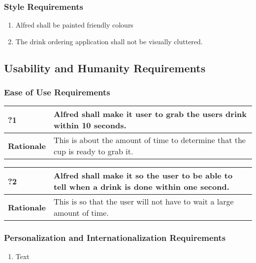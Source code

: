 \documentclass [11pt]{article}
\begin{document}
\subsubsection{Style Requirements}
	\begin{enumerate}[label=\textbf{(\roman*)}]
		\item  Alfred shall be painted friendly colours
		\item The drink ordering application shall not be visually cluttered.
	\end{enumerate}

\subsection{Usability and Humanity Requirements} 

\subsubsection{Ease of Use Requirements}
\begin{longtable}{| p{ } | p{ } | }\hline 
	\rowcolor{tableCell}\textbf{?1} & Alfred shall make it user to grab the users drink within 10 seconds. \\ \hline
	\textbf{Rationale} &  This is about the amount of time to determine that the cup is ready to grab it.\\ \hline 
\end{longtable}

\begin{longtable}{| p{ } | p{ } | }\hline 
	\rowcolor{tableCell}\textbf{?2} & Alfred shall make it so the user to be able to tell when a drink is done within one second. \\ \hline
	\textbf{Rationale} & This is so that the user will not have to wait a large amount of time.\\ \hline 
\end{longtable}


\subsubsection{Personalization and Internationalization Requirements}
	\begin{enumerate}[label=\textbf{(\roman*)}]
		\item Text
	\end{enumerate}
\end{document}
